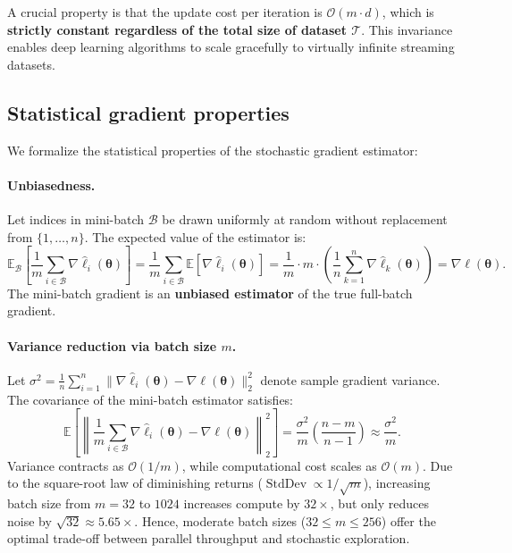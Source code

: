 \begin{remark}
A crucial property is that the update cost per iteration is $\mathcal{O}(m \cdot d)$, which is \textbf{strictly constant regardless of the total size of dataset $\mathcal{T}$}. This invariance enables deep learning algorithms to scale gracefully to virtually infinite streaming datasets.
\end{remark}

\subsection{Statistical gradient properties}
\label{sec:minibatch_statistics}
\label{sec:robbins_monro}

We formalize the statistical properties of the stochastic gradient estimator:

\paragraph{Unbiasedness.}
Let indices in mini-batch $\mathcal{B}$ be drawn uniformly at random without replacement from $\{1, \dots, n\}$. The expected value of the estimator is:
\begin{equation}
\mathbb{E}_{\mathcal{B}}\left[ \frac{1}{m} \sum_{i \in \mathcal{B}} \nabla \hat{\ell}_i(\boldsymbol{\theta}) \right] = \frac{1}{m} \sum_{i \in \mathcal{B}} \mathbb{E}\left[ \nabla \hat{\ell}_i(\boldsymbol{\theta}) \right] = \frac{1}{m} \cdot m \cdot \left( \frac{1}{n} \sum_{k=1}^n \nabla \hat{\ell}_k(\boldsymbol{\theta}) \right) = \nabla \ell(\boldsymbol{\theta}).
\label{eq:unbiased_gradient}
\end{equation}
The mini-batch gradient is an \textbf{unbiased estimator} of the true full-batch gradient.

\paragraph{Variance reduction via batch size $m$.}
Let $\sigma^2 = \frac{1}{n} \sum_{i=1}^n \|\nabla \hat{\ell}_i(\boldsymbol{\theta}) - \nabla \ell(\boldsymbol{\theta})\|_2^2$ denote sample gradient variance. The covariance of the mini-batch estimator satisfies:
\begin{equation}
\mathbb{E}\left[ \left\| \frac{1}{m} \sum_{i \in \mathcal{B}} \nabla \hat{\ell}_i(\boldsymbol{\theta}) - \nabla \ell(\boldsymbol{\theta}) \right\|_2^2 \right] = \frac{\sigma^2}{m} \left( \frac{n - m}{n - 1} \right) \approx \frac{\sigma^2}{m}.
\label{eq:minibatch_variance_reduction}
\end{equation}
Variance contracts as $\mathcal{O}(1/m)$, while computational cost scales as $\mathcal{O}(m)$. Due to the square-root law of diminishing returns ($\operatorname{StdDev} \propto 1/\sqrt{m}$), increasing batch size from $m = 32$ to $1024$ increases compute by $32\times$, but only reduces noise by $\sqrt{32} \approx 5.65\times$. Hence, moderate batch sizes ($32 \le m \le 256$) offer the optimal trade-off between parallel throughput and stochastic exploration.

